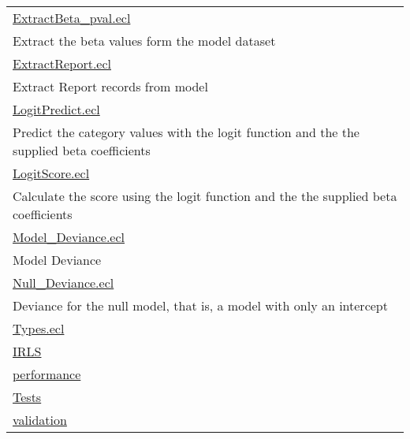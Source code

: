 {\begin{longtable}{|p{\textwidth}|}
\hline
\hyperlink{ecldoc:toc:ExtractBeta_pval}{ExtractBeta\_pval.ecl} \\
Extract the beta values form the model dataset \\
\hline
\hyperlink{ecldoc:toc:ExtractReport}{ExtractReport.ecl} \\
Extract Report records from model \\
\hline
\hyperlink{ecldoc:toc:LogitPredict}{LogitPredict.ecl} \\
Predict the category values with the logit function and the the supplied beta coefficients \\
\hline
\hyperlink{ecldoc:toc:LogitScore}{LogitScore.ecl} \\
Calculate the score using the logit function and the the supplied beta coefficients \\
\hline
\hyperlink{ecldoc:toc:Model_Deviance}{Model\_Deviance.ecl} \\
Model Deviance \\
\hline
\hyperlink{ecldoc:toc:Null_Deviance}{Null\_Deviance.ecl} \\
Deviance for the null model, that is, a model with only an intercept \\
\hline
\hyperlink{ecldoc:toc:Types}{Types.ecl} \\
\hline
\hyperlink{ecldoc:toc:root/IRLS}{IRLS} \\
\hline
\hyperlink{ecldoc:toc:root/performance}{performance} \\
\hline
\hyperlink{ecldoc:toc:root/Tests}{Tests} \\
\hline
\hyperlink{ecldoc:toc:root/validation}{validation} \\
\hline
\end{longtable}
}























